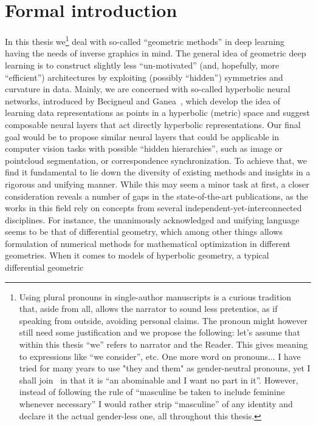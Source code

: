 \section*{Formal introduction}

In this thesis we\footnote{
Using plural pronouns in single-author manuscripts is a curious tradition that,
aside from all, allows the narrator to sound less pretentios, as if speaking
from outside, avoiding personal claims. The pronoun might however still need
some justification and we propose the following: let's assume that within this
thesis ``we'' refers to narrator and the Reader. This gives meaning to
expressions like ``we consider'', etc.  One more word on pronouns...
I have tried for many years to use "they and
them" as gender-neutral pronouns, yet I shall join~\cite{strictlyEnglish} in
that it is ``an abominable and I want no part in it''.  However, instead of
following the rule of ``masculine be taken to include feminine whenever
necessary'' I would rather strip ``masculine'' of any identity and declare it
the actual gender-less one, all throughout this thesis.}
deal with so-called ``geometric methods'' in deep learning having the needs of
inverse graphics in mind. The general idea of geometric deep learning is to
construct slightly less ``un-motivated'' (and, hopefully, more ``efficient'')
architectures by exploiting (possibly ``hidden'') symmetries and curvature in
data. Mainly, we are concerned with so-called hyperbolic neural networks,
introduced by Becigneul and Ganea~\cite{ganeaHNNs}, which develop the idea of
learning data representations as points in a hyperbolic (metric) space and
suggest composable neural layers that act directly hyperbolic representations.
Our final goal would be to propose similar neural layers that could be
applicable in computer vision tasks with possible ``hidden hierarchies'', such
as image or pointcloud segmentation, or correspondence synchronization. To
achieve that, we find it fundamental to lie down the diversity of existing
methods and insights in a rigorous and unifying manner. While this may seem a
minor task at first, a closer consideration reveals a number of gaps in the
state-of-the-art publications, as the works in this field rely on concepts from
several independent-yet-interconnected disciplines. For instance, the
unanimously acknowledged and unifying language seems to be that of differential
geometry, which among other things allows formulation of numerical methods for
mathematical optimization in different geometries. When it comes to models of
hyperbolic geometry, a typical differential geometric

